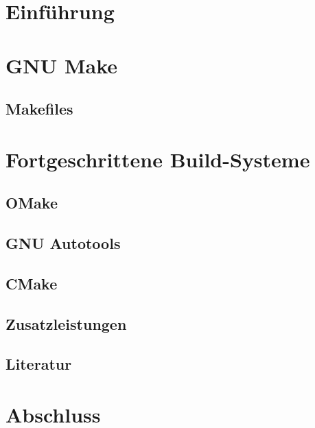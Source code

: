 \documentclass[xcolor={table}]{beamer}
\begin{document}

	\section{Einführung}
	
	

	\section{GNU Make}
		
		\subsection{Makefiles}
		
		
		

	\section{Fortgeschrittene Build-Systeme}
		\subsection{OMake}
			
		\subsection{GNU Autotools}
			
		\subsection{CMake}
			
		\subsection{Zusatzleistungen}
			
		\subsection{Literatur}
			

	\section{Abschluss}
	
	
\end{document}

